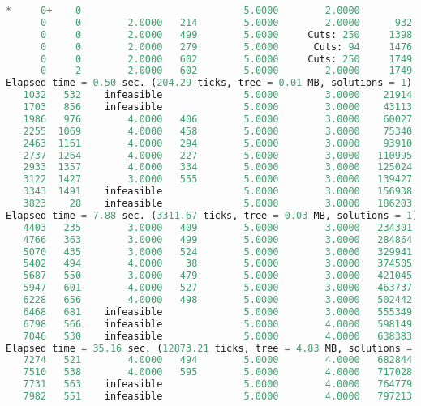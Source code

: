 \begin{lstlisting}[language=Python]
*     0+    0                            5.0000        2.0000            60.00%
      0     0        2.0000   214        5.0000        2.0000      932   60.00%
      0     0        2.0000   499        5.0000     Cuts: 250     1398   60.00%
      0     0        2.0000   279        5.0000      Cuts: 94     1476   60.00%
      0     0        2.0000   602        5.0000     Cuts: 250     1749   60.00%
      0     2        2.0000   602        5.0000        2.0000     1749   60.00%
Elapsed time = 0.50 sec. (204.29 ticks, tree = 0.01 MB, solutions = 1)
   1032   532    infeasible              5.0000        3.0000    21914   40.00%
   1703   856    infeasible              5.0000        3.0000    43113   40.00%
   1986   976        4.0000   406        5.0000        3.0000    60027   40.00%
   2255  1069        4.0000   458        5.0000        3.0000    75340   40.00%
   2463  1161        4.0000   294        5.0000        3.0000    93910   40.00%
   2737  1264        4.0000   227        5.0000        3.0000   110995   40.00%
   2933  1357        4.0000   334        5.0000        3.0000   125024   40.00%
   3122  1427        3.0000   555        5.0000        3.0000   139427   40.00%
   3343  1491    infeasible              5.0000        3.0000   156938   40.00%
   3823    28    infeasible              5.0000        3.0000   186203   40.00%
Elapsed time = 7.88 sec. (3311.67 ticks, tree = 0.03 MB, solutions = 1)
   4403   235        3.0000   409        5.0000        3.0000   234301   40.00%
   4766   363        3.0000   499        5.0000        3.0000   284864   40.00%
   5070   435        3.0000   524        5.0000        3.0000   329941   40.00%
   5402   494        4.0000    38        5.0000        3.0000   374505   40.00%
   5687   550        3.0000   479        5.0000        3.0000   421045   40.00%
   5947   601        4.0000   527        5.0000        3.0000   463737   40.00%
   6228   656        4.0000   498        5.0000        3.0000   502442   40.00%
   6468   681    infeasible              5.0000        3.0000   555349   40.00%
   6798   566    infeasible              5.0000        4.0000   598149   20.00%
   7046   530    infeasible              5.0000        4.0000   638383   20.00%
Elapsed time = 35.16 sec. (12873.21 ticks, tree = 4.83 MB, solutions = 1)
   7274   521        4.0000   494        5.0000        4.0000   682844   20.00%
   7510   538        4.0000   595        5.0000        4.0000   717028   20.00%
   7731   563    infeasible              5.0000        4.0000   764779   20.00%
   7982   551    infeasible              5.0000        4.0000   797213   20.00%

\end{lstlisting}
